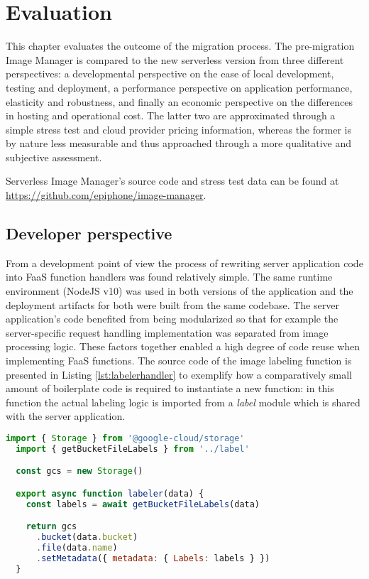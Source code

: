 \chapter{Evaluation} \label{cha:evaluation}

This chapter evaluates the outcome of the migration process. The pre-migration Image Manager is compared to the new serverless version from three different perspectives: a developmental perspective on the ease of local development, testing and deployment, a performance perspective on application performance, elasticity and robustness, and finally an economic perspective on the differences in hosting and operational cost. The latter two are approximated through a simple stress test and cloud provider pricing information, whereas the former is by nature less measurable and thus approached through a more qualitative and subjective assessment.

Serverless Image Manager's source code and stress test data can be found at \url{https://github.com/epiphone/image-manager}.

\section{Developer perspective}

From a development point of view the process of rewriting server application code into FaaS function handlers was found relatively simple. The same runtime environment (NodeJS v10) was used in both versions of the application and the deployment artifacts for both were built from the same codebase. The server application's code benefited from being modularized so that for example the server-specific request handling implementation was separated from image processing logic. These factors together enabled a high degree of code reuse when implementing FaaS functions. The source code of the image labeling function is presented in Listing \ref{lst:labelerhandler} to exemplify how a comparatively small amount of boilerplate code is required to instantiate a new function: in this function the actual labeling logic is imported from a \textit{label} module which is shared with the server application.

\begin{lstlisting}[language=JavaScript,caption=Image labeler function handler,captionpos=b,label=lst:labelerhandler,showstringspaces=false,belowskip=2em,frame=tb,aboveskip=2em]
  import { Storage } from '@google-cloud/storage'
  import { getBucketFileLabels } from '../label'

  const gcs = new Storage()

  export async function labeler(data) {
    const labels = await getBucketFileLabels(data)

    return gcs
      .bucket(data.bucket)
      .file(data.name)
      .setMetadata({ metadata: { Labels: labels } })
  }
\end{lstlisting}

